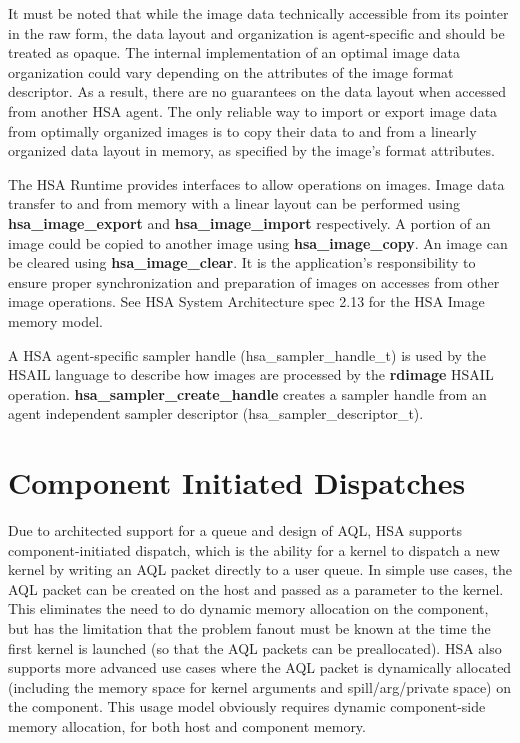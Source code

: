 \documentclass[final]{book}
\newcommand{\reffun}[1]{\textbf{#1}}
\newcommand{\reftyp}[1]{#1}
\newcommand{\refhsl}[1]{\reffun{#1}}
\begin{document}
It must be noted that while the image data technically accessible from its
pointer in the raw form, the data layout and organization is agent-specific and
should be treated as opaque. The internal implementation of an optimal image
data organization could vary depending on the attributes of the image format
descriptor. As a result, there are no guarantees on the data layout when
accessed from another HSA agent. The only reliable way to import or export image
data from optimally organized images is to copy their data to and from a
linearly organized data layout in memory, as specified by the image's format
attributes.

The HSA Runtime provides interfaces to allow operations on images. Image data
transfer to and from memory with a linear layout can be performed using
\reffun{hsa_image_export} and \reffun{hsa_image_import} respectively. A
portion of an image could be copied to another image using
\reffun{hsa_image_copy}. An image can be cleared using
\reffun{hsa_image_clear}. It is the application's responsibility to ensure
proper synchronization and preparation of images on accesses from other image
operations. See HSA System Architecture spec 2.13 for the HSA Image memory
model.

A HSA agent-specific sampler handle (\reftyp{hsa_sampler_handle_t}) is used by
the HSAIL language to describe how images are processed by the \refhsl{rdimage}
HSAIL operation. \reffun{hsa_sampler_create_handle} creates a sampler handle
from an agent independent sampler descriptor
(\reftyp{hsa_sampler_descriptor_t}).

\section{Component Initiated Dispatches} \label{architected}
\hypertarget{architectedchptr}{}

Due to architected support for a queue and design of AQL, HSA supports
component-initiated dispatch, which is the ability for a kernel to dispatch a
new kernel by writing an AQL packet directly to a user queue. In simple use
cases, the AQL packet can be created on the host and passed as a parameter to
the kernel. This eliminates the need to do dynamic memory allocation on the
component, but has the limitation that the problem fanout must be known at the
time the first kernel is launched (so that the AQL packets can be
preallocated). HSA also supports more advanced use cases where the AQL packet is
dynamically allocated (including the memory space for kernel arguments and
spill/arg/private space) on the component. This usage model obviously requires
dynamic component-side memory allocation, for both host and component memory.
\end{document}
